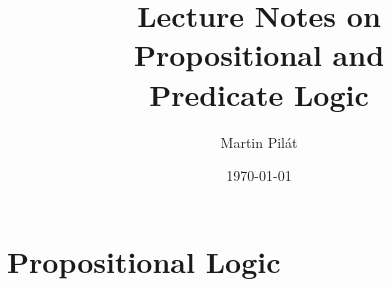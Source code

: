 \documentclass[a4paper,nofonts,justified,colorinlistoftodos,hidelinks]{tufte-book}
\title{Lecture Notes on \\ Propositional and \\ Predicate Logic}
\author{Martin Pilát}
\date{\today}
\begin{document}
\maketitle

\mainmatter



\part{Propositional Logic}



\backmatter

\setcounter{tocdepth}{2}
\tableofcontents
\listoffigures
\listoftables
\listofalgorithms 
\listoftodos
\end{document}
